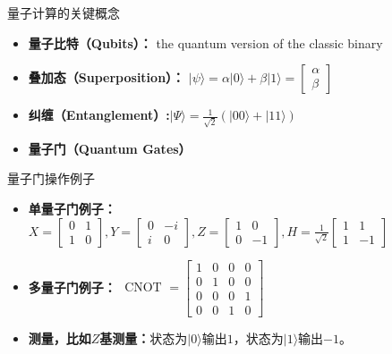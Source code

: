 \documentclass[aspectratio=1610]{ctexbeamer}
\begin{document}
\begin{frame}{量子计算的关键概念}
    \begin{itemize}[itemsep=18pt]
        \item \textbf{量子比特（Qubits）：} the quantum version of the classic binary
        \item \textbf{叠加态（Superposition）：} $|\psi\rangle = \alpha |0\rangle + \beta |1\rangle=\left[\begin{array}{r}\alpha \\\beta\end{array}\right]$
        \item \textbf{纠缠（Entanglement）:}$|\Psi\rangle = \frac{1}{\sqrt{2}}(|00\rangle+|11\rangle)$
        \item \textbf{量子门（Quantum Gates）} 
    \end{itemize}
\end{frame}
\begin{frame}{量子门操作例子}
    \begin{itemize}
        \item \textbf{单量子门例子：}$X=\left[\begin{array}{rr}0 & 1 \\1 & 0 \end{array}\right],Y=\left[\begin{array}{rr}0 & -i \\i & 0 \end{array}\right],Z=\left[\begin{array}{rr}1 & 0 \\0 & -1 \end{array}\right],H=\frac{1}{\sqrt{2}}\left[\begin{array}{rr}1 & 1 \\1 & -1 \end{array}\right]$ 
        \item \textbf{多量子门例子：} $\text { CNOT }=\left[\begin{array}{llll}
            1 & 0 & 0 & 0 \\
            0 & 1 & 0 & 0 \\
            0 & 0 & 0 & 1 \\
            0 & 0 & 1 & 0
            \end{array}\right]$
        \item \textbf{测量，比如$Z$基测量：}状态为$|0\rangle$输出$1$，状态为$|1\rangle$输出$-1$。
    \end{itemize}
\end{frame}
\end{document}
